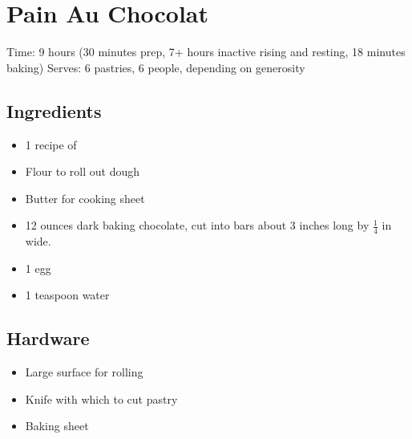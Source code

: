 \section{Pain Au Chocolat}
\label{painAuChocolat}
\setcounter{secnumdepth}{0}
Time: 9 hours (30 minutes prep, 7+ hours inactive rising and resting, 18 minutes baking)
Serves: 6 pastries, 6 people, depending on generosity

\begin{multicols}{2}
\subsection*{Ingredients}
\begin{itemize}
    \item 1 recipe of 
    \item Flour to roll out dough
    \item Butter for cooking sheet
    \item 12 ounces dark baking chocolate, cut into bars about 3 inches long by \( \frac{1}{4} \) in wide.
    \item 1 egg
    \item 1 teaspoon water
\end{itemize}

\subsection*{Hardware}
\begin{itemize}
    \item Large surface for rolling
    \item Knife with which to cut pastry
    \item Baking sheet
\end{itemize}
\clearpage


\end{multicols}
